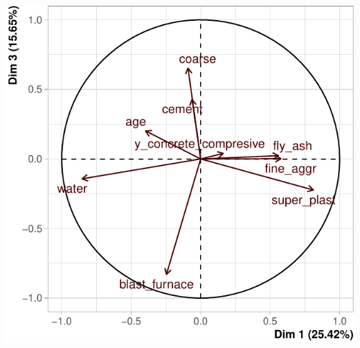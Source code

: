 \documentclass[
  12pt,
]{article}
\begin{document}
\begin{center}\includegraphics{rmd_final_files/figure-latex/unnamed-chunk-37-1} \end{center}
\end{document}
